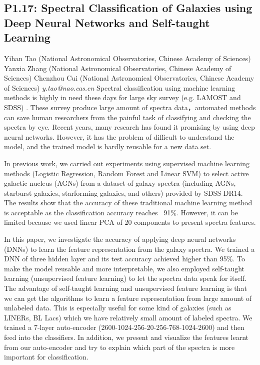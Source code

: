 \documentclass{report}
\begin{document}
\subsection*{P1.17: Spectral Classification of Galaxies using Deep Neural Networks and Self-taught Learning}
\bigskip
Yihan Tao (National Astronomical Observatories, Chinese Academy of Sciences) \newline Yanxia Zhang (National Astronomical Observatories, Chinese Academy of Sciences) \newline  Chenzhou Cui (National Astronomical Observatories, Chinese Academy of Sciences)\newline   \newline  \newline  \newline\newline
{\it y.tao@nao.cas.cn}\newline
\newline\newline
Spectral classification using machine learning methods is highly in need these days for large sky survey (e.g. LAMOST and SDSS) . These survey produce large amount of spectra data，automated methods can save human researchers from the painful task of classifying and checking the spectra by eye. Recent years, many research has found it promising by using deep neural networks. However, it has the problem of difficult to understand the model, and the trained model is hardly reusable for a new data set. 

In previous work, we carried out experiments using supervised machine learning methods (Logistic Regression, Random Forest and Linear SVM) to select active galactic nucleus (AGNs) from a dataset of galaxy spectra (including AGNs, starburst galaxies, starforming galaxies, and others) provided by SDSS DR14. The results show that the accuracy of these traditional machine learning method is acceptable as the classification accuracy reaches ~91\%. However, it can be limited because we used linear PCA of 20 components to present spectra features.

In this paper, we investigate the accuracy of applying deep neural networks (DNNs) to learn the feature representation from the galaxy spectra. We trained a DNN of three hidden layer and its test accuracy achieved higher than 95\%. To make the model reusable and more interpretable, we also employed self-taught learning (unsupervised feature learning) to let the spectra data speak for itself. The advantage of self-taught learning and unsupervised feature learning is that we can get the algorithms to learn a feature representation from large amount of unlabeled data. This is especially useful for some kind of galaxies (such as LINERs, BL Lacs) which we have relatively small amount of labeled spectra. We trained a 7-layer auto-encoder (2600-1024-256-20-256-768-1024-2600) and then feed into the classifiers.  In addition, we present and visualize the features learnt from our auto-encoder and try to explain which part of the spectra is more important for classification.\newline
\newpage
\end{document}
